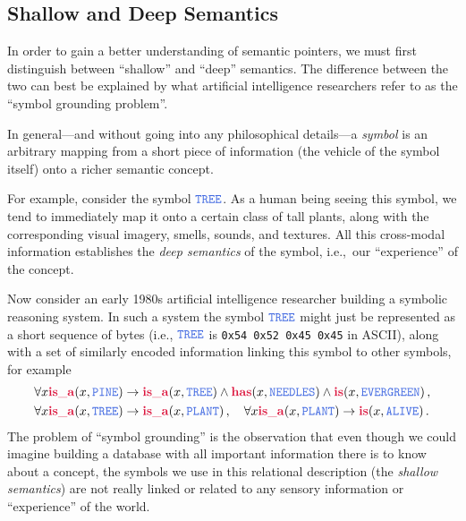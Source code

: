 \documentclass[10pt,letterpaper,oneside]{article}
\newcommand{\Pred}[1]{\ensuremath{\mathbf{\textcolor{Crimson}{#1}}}}
\newcommand{\Obj}[1]{\ensuremath{\mathtt{\textcolor{RoyalBlue}{#1}}}}
\begin{document}
\subsection{Shallow and Deep Semantics}

In order to gain a better understanding of semantic pointers, we must first distinguish between \enquote{shallow} and \enquote{deep} semantics. The difference between the two can best be explained by what artificial intelligence researchers refer to as the \enquote{symbol grounding problem}.

In general---and without going into any philosophical details---a \emph{symbol} is an arbitrary mapping from a short piece of information (the vehicle of the symbol itself) onto a richer semantic concept.

For example, consider the symbol {\Obj{TREE}}. As a human being seeing this symbol, we tend to immediately map it onto a certain class of tall plants, along with the corresponding visual imagery, smells, sounds, and textures. All this cross-modal information establishes the \emph{deep semantics} of the symbol, i.e.,~our \enquote{experience} of the concept.

Now consider an early 1980s artificial intelligence researcher building a symbolic reasoning system. In such a system the symbol {\Obj{TREE}} might just be represented as a short sequence of bytes (i.e., \Obj{TREE} is \texttt{0x54 0x52 0x45 0x45} in ASCII), along with a set of similarly encoded information linking this symbol to other symbols, for example
\begin{align*}
	\forall x \Pred{is\_a}(x, \Obj{PINE}) &\rightarrow \Pred{is\_a}(x, \Obj{TREE}) \wedge \Pred{has}(x, \Obj{NEEDLES}) \wedge \Pred{is}(x, \Obj{EVERGREEN}) \,, \\
	\forall x \Pred{is\_a}(x, \Obj{TREE}) &\rightarrow \Pred{is\_a}(x, \Obj{PLANT}) \,, \quad \forall x \Pred{is\_a}(x, \Obj{PLANT}) \rightarrow \Pred{is}(x, \Obj{ALIVE}) \,.
\end{align*}
The problem of \enquote{symbol grounding} is the observation that even though we could imagine building a database with all important information there is to know about a concept, the symbols we use in this relational description (the \emph{shallow semantics}) are not really linked or related to any sensory information or \enquote{experience} of the world.

\end{document}
